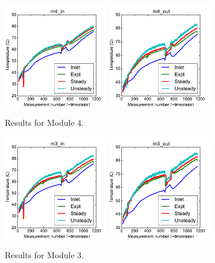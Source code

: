 \documentclass{article}
\begin{document}
\clearpage
\begin{figure}[!ht]
\centering
\includegraphics[width=0.4\textwidth]{../../data/ICSolar/images/Jan28_m4_in_compare.pdf}\hspace{0.05\textwidth}
\includegraphics[width=0.4\textwidth]{../../data/ICSolar/images/Jan28_m4_out_compare.pdf}\hspace{0.05\textwidth}\\
\caption{Results for Module 4.}\end{figure}
\begin{figure}[!ht]
\centering
\includegraphics[width=0.4\textwidth]{../../data/ICSolar/images/Jan28_m3_in_compare.pdf}\hspace{0.05\textwidth}
\includegraphics[width=0.4\textwidth]{../../data/ICSolar/images/Jan28_m3_out_compare.pdf}\hspace{0.05\textwidth}\\
\caption{Results for Module 3.}\end{figure}
\end{document}
